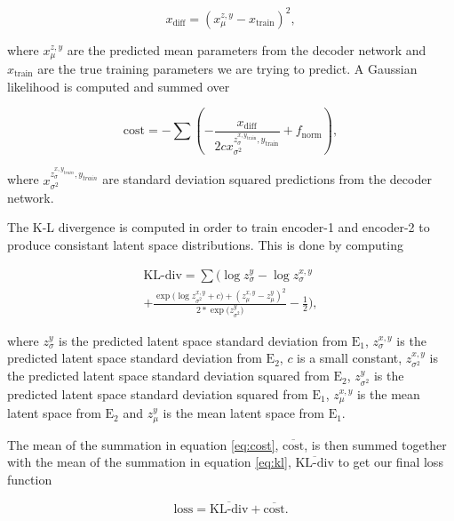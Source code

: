 \documentclass[%
showpacs,
 amsmath,amssymb,
 aps,
 twocolumn,
 prl,
 reprint,
floatfix,
]{revtex4-1}
\begin{document}
\begin{equation}
    x_{\textrm{diff}} = (x^{z,y}_{\mu} - x_{\textrm{train}})^{2},
\end{equation}

where $x^{z,y}_{\mu}$ are the predicted mean parameters from the decoder network 
and $x_{\textrm{train}}$ are the true training parameters we are 
trying to predict. A Gaussian likelihood is computed and summed over

\begin{equation}
    \textrm{cost} = - \sum (-\frac{x_{\textrm{diff}}}{2c  
    x^{z^{x,y_{\textrm{train}}}_{\sigma},y_{\textrm{train}}}_{\sigma^{2}}} + f_{\textrm{norm}}),\label{eq:cost}
\end{equation}

where $x^{z^{x,y_{train}}_{\sigma},y_{train}}_{\sigma^{2}}$ are standard deviation squared predictions from the 
decoder network.


%
%
The K-L divergence is computed in order to train 
encoder-1 and encoder-2 to produce consistant latent space 
distributions. This is done by computing 

\begin{equation}
    \begin{split}
    \textrm{KL-div} = \sum(\log{z^{y}_{\sigma}}-\log{z^{x,y}_{\sigma}} \\
    +\frac{\exp{(\log{z^{x,y}_{\sigma^{2}}+c)}}+(z^{x,y}_{\mu}-z^{y}_{\mu})^{2}}{2*\exp{(z^{y}_{\sigma^{2}}})}
    -\frac{1}{2}),\label{eq:kl}
    \end{split}
\end{equation}

where $z^{y}_{\sigma}$ is the predicted latent space standard deviation from $\textrm{E}_1$, 
$z^{x,y}_{\sigma}$ is the predicted latent space standard deviation from $\textrm{E}_2$, 
$c$ is a small constant, $z^{x,y}_{\sigma^{2}}$ is the predicted latent space 
standard deviation squared from $\textrm{E}_2$, $z^{y}_{\sigma^{2}}$ is the predicted 
latent space standard deviation squared from $\textrm{E}_1$, $z^{x,y}_{\mu}$ is the 
mean latent space from $\textrm{E}_2$ and $z^{y}_{\mu}$ is the mean latent space 
from $\textrm{E}_1$.

The mean of the summation in equation \ref{eq:cost}, $\overline{\textrm{cost}}$, 
is then summed together with the mean of the summation in equation \ref{eq:kl}, 
$\overline{\textrm{KL-div}}$ to 
get our final loss function

\begin{equation}
    \textrm{loss} = \overline{\textrm{KL-div}} + \overline{\textrm{cost}}.
\end{equation}
\end{document}
